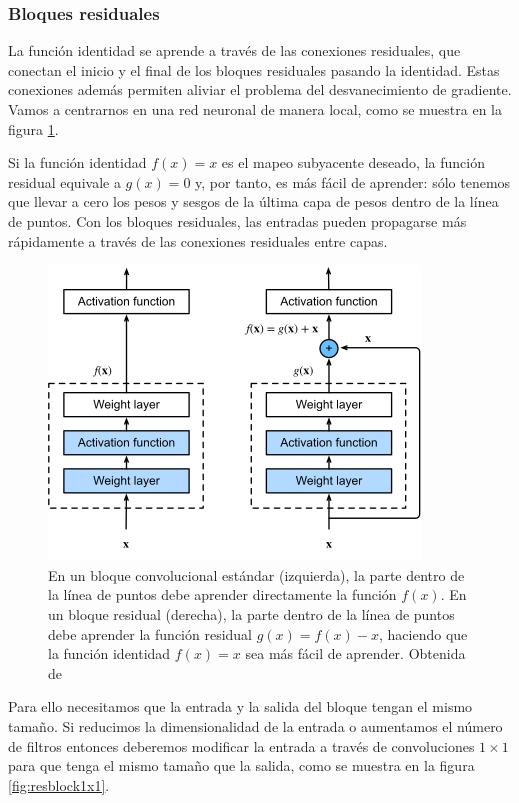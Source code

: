 \subsubsection{Bloques residuales}

La función identidad se aprende a través de las conexiones residuales, que conectan el inicio y el final de los bloques residuales pasando la identidad. Estas conexiones además permiten aliviar el problema del desvanecimiento de gradiente. Vamos a centrarnos en una red neuronal de manera local, como se muestra en la figura \ref{fig:resblock}. 

Si la función identidad $f(x)=x$ es el mapeo subyacente deseado, la función residual equivale a $g(x)=0$ y, por tanto, es más fácil de aprender: sólo tenemos que llevar a cero los pesos y sesgos de la última capa de pesos dentro de la línea de puntos. Con los bloques residuales, las entradas pueden propagarse más rápidamente a través de las conexiones residuales entre capas.

\begin{figure}
    \centering
    \includegraphics[width=0.75\linewidth]{Plantilla_TFG_latex//imagenes//Inf//2.Fund/resblock.png}
    \caption{En un bloque convolucional estándar (izquierda), la parte dentro de la línea de puntos debe aprender directamente la función $f(x)$. En un bloque residual (derecha), la parte dentro de la línea de puntos debe aprender la función residual $g(x)=f(x)-x$, haciendo que la función identidad $f(x)=x$ sea más fácil de aprender. Obtenida de \cite{divedeeplearning}}
    \label{fig:resblock}
\end{figure}

Para ello necesitamos que la entrada y la salida del bloque tengan el mismo tamaño. Si reducimos la dimensionalidad de la entrada o aumentamos el número de filtros entonces deberemos modificar la entrada a través de convoluciones $1 \times 1$ para que tenga el mismo tamaño que la salida, como se muestra en la figura \ref{fig:resblock1x1}.

